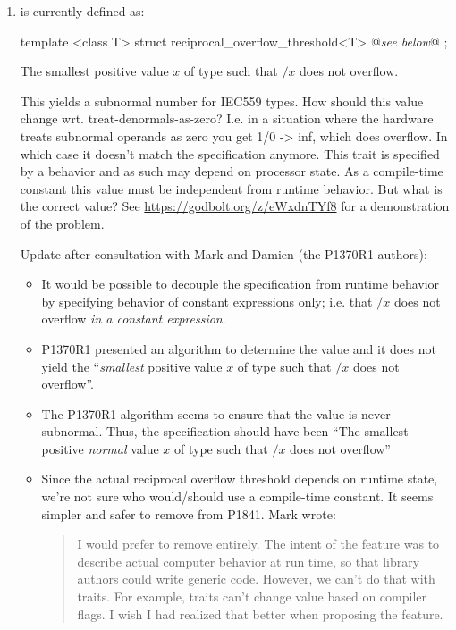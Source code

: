 \begin{enumerate}
  \item {} is currently defined as:
  \begin{wgText}
\begin{itemdecl}
  template <class T> struct reciprocal_overflow_threshold<T> { @\emph{see below}@ };
\end{itemdecl}
\begin{itemdescr}
\setcounter{Paras}{8}
  \pnum The smallest positive value $x$ of type  such that $/x$ does not overflow.
\end{itemdescr}
  \end{wgText}
  This yields a subnormal number for IEC559 types.
  How should this value change wrt. treat-denormals-as-zero?
  I.e. in a situation where the hardware treats subnormal operands as zero you get 1/0 -> inf, which does overflow.
  In which case it doesn't match the specification anymore.
  This trait is specified by a behavior and as such may depend on processor state.
  As a compile-time constant this value must be independent from runtime behavior.
  But what is the correct value?
  See \url{https://godbolt.org/z/eWxdnTYf8} for a demonstration of the problem.

  Update after consultation with Mark and Damien (the P1370R1 authors):
  \begin{itemize}
  \item It would be possible to decouple the specification from runtime behavior by specifying behavior of constant expressions only;
    i.e. that $/x$ does not overflow \emph{in a constant expression}.
  \item P1370R1 presented an algorithm to determine the value and it does not yield the “\emph{smallest} positive value $x$ of type  such that $/x$ does not overflow”.
  \item The P1370R1 algorithm seems to ensure that the value is never subnormal.
    Thus, the specification should have been “The smallest positive \emph{normal} value $x$ of type  such that $/x$ does not overflow”
  \item Since the actual reciprocal overflow threshold depends on runtime state, we're not sure who would/should use a compile-time constant.
    It seems simpler and safer to remove  from P1841.
    Mark wrote:
    \begin{quote}
    I would prefer to remove  entirely.  The
    intent of the feature was to describe actual computer behavior at run
    time, so that library authors could write generic code.  However, we
    can't do that with traits.  For example, traits can't change value based
    on compiler flags.  I wish I had realized that better when proposing
    the feature.
    \end{quote}
  \end{itemize}


\end{enumerate}
